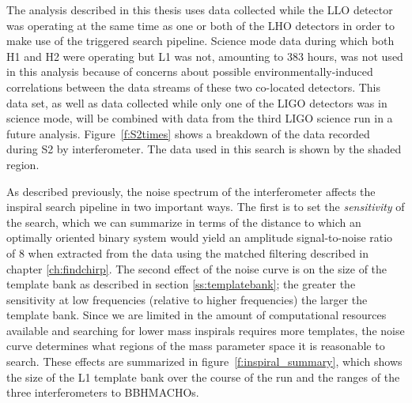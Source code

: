 The analysis described in this thesis uses data collected while the LLO
detector was operating at the same time as one or both of the LHO detectors in
order to make use of the triggered search pipeline.  Science mode data during
which both H1 and H2 were operating but L1 was not, amounting to 383 hours,
was not used in this analysis because of concerns about possible
environmentally-induced correlations between the data streams of these two
co-located detectors. This data set, as well as data collected while only one
of the LIGO detectors was in science mode, will be combined with data from the
third LIGO science run in a future analysis. Figure~\ref{f:S2times} shows a
breakdown of the data recorded during S2 by interferometer. The data used in
this search is shown by the shaded region.

As described previously, the noise spectrum of the interferometer affects the
inspiral search pipeline in two important ways. The first is to set the
\emph{sensitivity} of the search, which we can summarize  in terms of the
distance to which an optimally oriented binary system would yield an amplitude
signal-to-noise ratio of 8 when extracted from the data using the
matched filtering described in chapter \ref{ch:findchirp}.  The second effect
of the noise curve is on the size of the template bank as described in section
\ref{ss:templatebank}; the greater the sensitivity at low frequencies
(relative to higher frequencies) the larger the template bank.  Since we are
limited in the amount of computational resources available and searching for
lower mass inspirals requires more templates, the noise curve determines what
regions of the mass parameter space it is reasonable to search. These effects
are summarized in figure~\ref{f:inspiral_summary}, which shows the size of the
L1 template bank over the course of the run and the ranges of the three
interferometers to BBHMACHOs.

